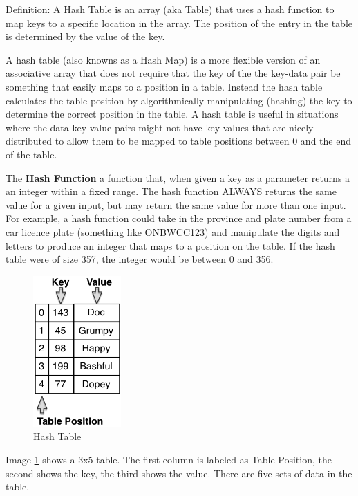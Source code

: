  Definition:  A Hash Table is an array (aka Table) that uses a hash function to map keys to a specific location in the array.   The position of the entry in the table is determined by the value of the key.  
 
 A hash table (also knowns as a Hash Map)  is a more flexible version of an associative array that does not require that the key of the the key-data pair be something that easily maps to a position in a table.   Instead the hash table calculates the table position by algorithmically manipulating (hashing) the key to determine the correct position in the table.   A hash table is useful in situations where the data key-value pairs might not have key values that are nicely distributed to allow them to be mapped to table positions between 0 and the end of the table.
 
 
The \textbf{Hash Function} a function that, when given a key as a parameter returns a  an integer within a  fixed range.   The hash function ALWAYS returns the same value for a given input, but may return the same value for more than one input.   For example,  a hash function could take in the province and plate number from a car licence plate (something like ONBWCC123) and manipulate the digits and letters to produce an integer that maps to a position on the table.  If the hash table were of size 357, the integer would be between 0 and 356.  

\begin{figure}[H]
\centering
\includegraphics[width=0.3\textwidth]{pictures/Hash_Tables_0.png}
\caption{Hash Table}
\label{fig:hashTable}
\end{figure}

Image \ref{fig:hashTable} shows a 3x5 table.  The first column is labeled as Table Position, the second shows the key, the third shows the value.  There are five sets of data in the table.  

